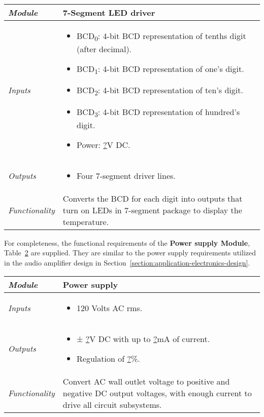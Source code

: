 \begin{table}[h]
\label{table:digitalThermoSevenSeg}
\begin{tabular}{|l|m{10cm}|}
\hline
\emph{Module} & 7-Segment LED driver\\ \hline
\emph{Inputs} & 
\begin{itemize}
\item
  BCD\textsubscript{0}: 4-bit BCD representation of tenths digit (after
  decimal).
\item
  BCD\textsubscript{1}: 4-bit BCD representation of one's digit.
\item
  BCD\textsubscript{2}: 4-bit BCD representation of ten's digit.
\item
  BCD\textsubscript{3}: 4-bit BCD representation of hundred's digit.
\item
  Power: \ul{?}V DC.
\end{itemize}  \\ \hline
\emph{Outputs} & 
\begin{itemize}
\item
  Four 7-segment driver lines.
\end{itemize}\\ \hline
\emph{Functionality} & Converts the BCD for each digit into outputs that
turn on LEDs in 7-segment package to display the temperature.  \\ \hline
\end{tabular}
\end{table}



For completeness, the functional requirements of
the \textbf{Power supply Module}, 
Table~\ref{table:digitalThermoPowerSupply} are supplied. 
They are similar to the power supply requirements utilized in
the audio amplifier design in Section~\ref{section:application-electronics-design}.


\begin{table}[h]
\label{table:digitalThermoPowerSupply}
\begin{tabular}{|l|m{10cm}|}
\hline
\emph{Module} & Power supply\\ \hline

\emph{Inputs} & 
\begin{itemize}
\item  120 Volts AC rms.
\end{itemize} \\ \hline

\emph{Outputs} & 
\begin{itemize}
\item  ± \ul{?}V DC with up to \ul{?}mA of current.
\item  Regulation of \ul{?}\%.
\end{itemize}\\ \hline

\emph{Functionality} & Convert AC wall outlet voltage to positive and
negative DC output voltages, with enough current to drive all circuit
subsystems. \\ \hline

\end{tabular}
\end{table}



